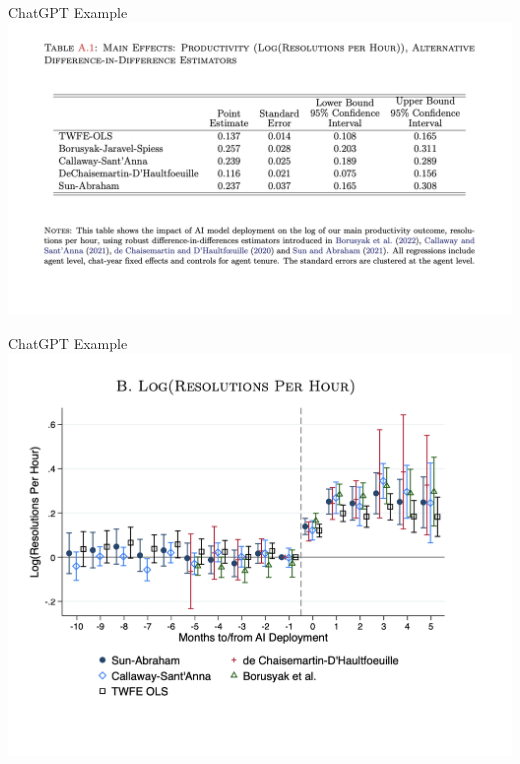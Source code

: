 \documentclass{beamer}
\begin{document}
\begin{frame}{ChatGPT Example}
             \includegraphics[scale=0.35]{./lecture_includes/chatgpt_results}

\end{frame}

\begin{frame}{ChatGPT Example}
             \includegraphics[scale=0.45]{./lecture_includes/chatgpt_log}

\end{frame}
\end{document}
